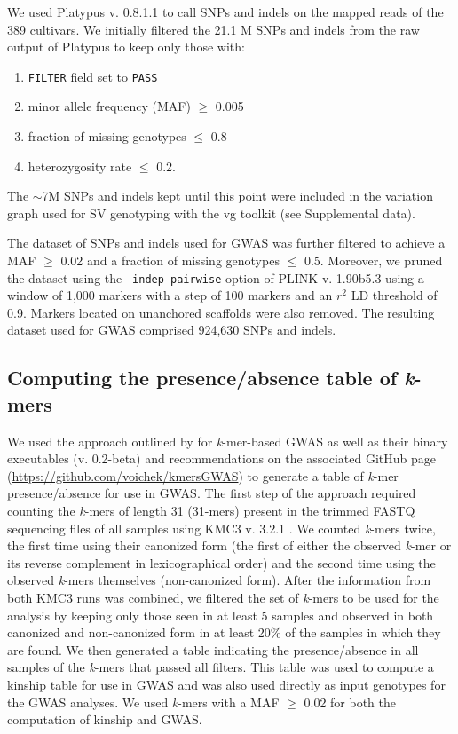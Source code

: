 We used Platypus v. 0.8.1.1 \citep{rimmer2014} to call SNPs and indels on the
mapped reads of the 389 cultivars. We initially filtered the 21.1 M SNPs and
indels from the raw output of Platypus to keep only those with:

\begin{enumerate}
	\item \texttt{FILTER} field set to \texttt{PASS}
	\item minor allele frequency (MAF) $\geq$ 0.005
	\item fraction of missing genotypes $\leq$ 0.8
	\item heterozygosity rate $\leq$ 0.2.
\end{enumerate}

The $\sim$7M SNPs and indels kept until this point were included in
the variation graph used for SV genotyping with the vg toolkit (see
Supplemental data).

The dataset of SNPs and indels used for GWAS was further filtered to achieve a
MAF $\geq$ 0.02 and a fraction of missing genotypes $\leq$ 0.5. Moreover, we
pruned the dataset using the \texttt{-\-indep-pairwise} option of PLINK v.
1.90b5.3 \citep{purcell2007} using a window of 1,000 markers with a step of 100
markers and an $r^2$ LD threshold of 0.9. Markers located on unanchored
scaffolds were also removed. The resulting dataset used for GWAS comprised
924,630 SNPs and indels.

\subsection*{Computing the presence/absence table of \emph{k}-mers}
\label{sv-gwas-kmer-pav}

We used the approach outlined by \cite{voichek2020} for \emph{k}-mer-based GWAS
as well as their binary executables (v. 0.2-beta) and recommendations on the
associated GitHub page (\url{https://github.com/voichek/kmersGWAS}) to generate
a table of \emph{k}-mer presence/absence for use in GWAS.  The first step of
the approach required counting the \emph{k}-mers of length 31 (31-mers) present
in the trimmed FASTQ sequencing files of all samples using KMC3 v. 3.2.1
\citep{kokot2017}. We counted \emph{k}-mers twice, the first time using their
canonized form (the first of either the observed \textit{k}-mer or its reverse
complement in lexicographical order) and the second time using the observed
\emph{k}-mers themselves (non-canonized form). After the information from both KMC3 runs was
combined, we filtered the set of \emph{k}-mers to be used for the analysis by
keeping only those seen in at least 5 samples and observed in both canonized
and non-canonized form in at least 20\% of the samples in which they are found.
We then generated a table indicating the presence/absence in all samples of the
\emph{k}-mers that passed all filters. This table was used to compute a kinship
table for use in GWAS and was also used directly as input genotypes for the
GWAS analyses. We used \emph{k}-mers with a MAF $\geq$ 0.02 for both the
computation of kinship and GWAS.


